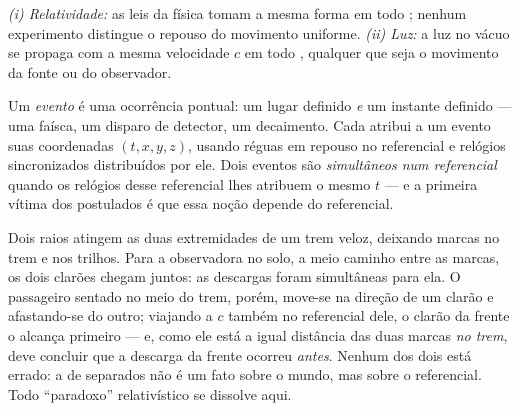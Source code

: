 \begin{theorem}\label{thm:b3:relativistic-kinematics:postulates}
\emph{(i) Relatividade:} as leis da física tomam a mesma forma em todo
; nenhum experimento distingue o repouso do
movimento uniforme. \emph{(ii) Luz:} a luz no vácuo se propaga com a
mesma velocidade $c$ em todo , qualquer que seja o
movimento da fonte ou do observador.
\end{theorem}
\admitted

\begin{definition}\label{def:b3:relativistic-kinematics:event}
Um \emph{evento} é uma ocorrência pontual: um lugar definido \emph{e}
um instante definido --- uma faísca, um disparo de detector, um
decaimento. Cada  atribui a um evento suas
coordenadas $(t, x, y, z)$, usando réguas em repouso no referencial e
relógios sincronizados distribuídos por ele. Dois eventos são
\emph{simultâneos num referencial} quando os relógios desse referencial
lhes atribuem o mesmo $t$ --- e a primeira vítima dos postulados é que
essa noção depende do referencial.
\end{definition}

\begin{example}\label{ex:b3:relativistic-kinematics:train}
Dois raios atingem as duas extremidades de um trem veloz, deixando
marcas no trem e nos trilhos. Para a observadora no solo, a meio
caminho entre as marcas, os dois clarões chegam juntos: as descargas
foram simultâneas para ela. O passageiro sentado no meio do trem,
porém, move-se na direção de um clarão e afastando-se do outro;
viajando a $c$ também no referencial dele, o clarão da frente o alcança
primeiro --- e, como ele está a igual distância das duas marcas
\emph{no trem}, deve concluir que a descarga da frente ocorreu
\emph{antes}. Nenhum dos dois está errado: a  de 
separados não é um fato sobre o mundo, mas sobre o referencial. Todo
``paradoxo'' relativístico se dissolve aqui.
\end{example}

